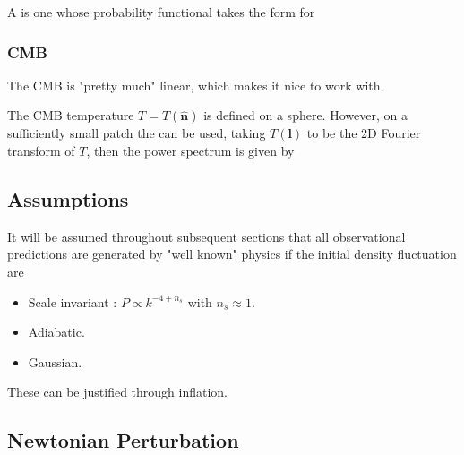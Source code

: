 \documentclass{article}
\begin{document}
\begin{definition}
A  is one whose probability functional takes the form 
for 
\end{definition}

\subsubsection*{CMB}
\begin{idea}
The CMB is "pretty much" linear, which makes it nice to work with. 
\end{idea}

\begin{definition}
The CMB temperature $T=T(\hat{\bm{n}})$ is defined on a sphere. However, on a sufficiently small patch the  can be used, taking $T(\bm{l})$ to be the 2D Fourier transform of $T$, then the power spectrum is given by 
\end{definition}

\subsection{Assumptions}
It will be assumed throughout subsequent sections that all observational predictions are generated by "well known" physics if the initial density fluctuation are 
\begin{itemize}
    \item Scale invariant : $P \propto k^{-4 + n_s}$ with $n_s \approx 1$. 
    \item Adiabatic. 
    \item Gaussian.
\end{itemize}
These can be justified through inflation. 

\subsection{Newtonian Perturbation}
\end{document}
